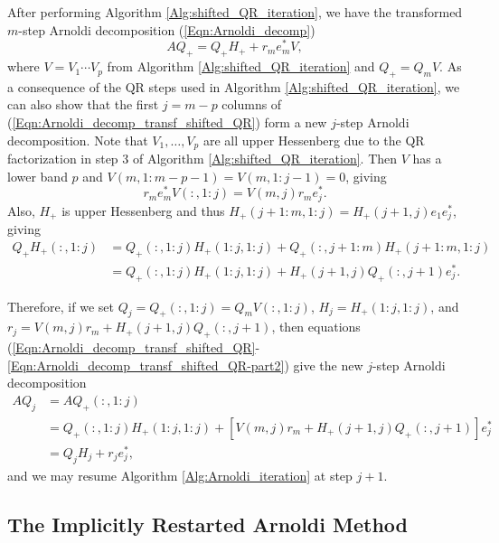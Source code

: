 After performing Algorithm \ref{Alg:shifted_QR_iteration}, we have the transformed $m$-step Arnoldi decomposition (\ref{Eqn:Arnoldi_decomp})
\begin{equation}			\label{Eqn:Arnoldi_decomp_transf_shifted_QR}
AQ_+ = Q_+H_+ + r_me_m^*V,
\end{equation}
where $V = V_1 \cdots V_p$ from Algorithm \ref{Alg:shifted_QR_iteration} and $Q_+ = Q_mV$.  As a consequence of the QR steps used in Algorithm \ref{Alg:shifted_QR_iteration}, we can also show that the first $j = m-p$ columns of (\ref{Eqn:Arnoldi_decomp_transf_shifted_QR}) form a new $j$-step Arnoldi decomposition.  Note that $V_1, \ldots, V_p$ are all upper Hessenberg due to the QR factorization in step 3 of Algorithm \ref{Alg:shifted_QR_iteration}.  Then $V$ has a lower band $p$ and $V(m, 1:m-p-1) = V(m, 1:j-1) = 0$, giving
\begin{equation} 			\label{Eqn:Arnoldi_decomp_transf_shifted_QR-part1}
r_me_m^*V(:, 1:j) = V(m,j)r_me_j^*.
\end{equation}
Also, $H_+$ is upper Hessenberg and thus $H_+(j+1:m, 1:j) = H_+(j+1,j)e_1e_j^*$, giving
\begin{equation} 		\label{Eqn:Arnoldi_decomp_transf_shifted_QR-part2}
\begin{split}
Q_+H_+(:, 1:j) 
	&	=  Q_+(:, 1:j) H_+(1:j, 1:j) + Q_+(:, j+1:m)H_+(j+1:m, 1:j) \\
	&	=	Q_+(:, 1:j) H_+(1:j, 1:j) +  H_+(j+1,j)Q_+(:,j+1)e_j^*.
\end{split}
\end{equation}

Therefore, if we set $Q_j = Q_+(:, 1:j) = Q_mV(:, 1:j)$, $H_j = H_+(1:j, 1:j)$, and $r_j = V(m,j)r_m + H_+(j+1,j)Q_+(:,j+1)$, then equations (\ref{Eqn:Arnoldi_decomp_transf_shifted_QR}-\ref{Eqn:Arnoldi_decomp_transf_shifted_QR-part2}) give the new $j$-step Arnoldi decomposition
\begin{equation}		\label{Eqn:Arnoldi_decomp_j-step_update}
\begin{split}
AQ_j  
	&	= AQ_+(:, 1:j) 	\\
	& = Q_+(:, 1:j)H_+(1:j, 1:j) + \left[V(m,j)r_m + H_+(j+1,j)Q_+(:,j+1) \right] e_j^*		\\
	& = Q_jH_j + r_je_j^*,
\end{split}
\end{equation}
and we may resume Algorithm \ref{Alg:Arnoldi_iteration} at step $j+1$.




\subsection{The Implicitly Restarted Arnoldi Method} 			\label{Subsubsec:evol_mats-IRAM}


